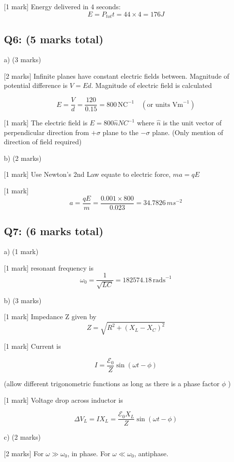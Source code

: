 \documentclass[a4paper,11pt]{article}
\begin{document}
[1 mark] Energy delivered in 4 seconds: 
\[ E = P_{tot} t = 44 \times 4 = 176 J \]

\subsection*{Q6: (5 marks total)}

a) (3 marks)

[2 marks] Infinite planes have constant electric fields between. Magnitude of potential difference is \( V = Ed \). Magnitude of electric field is calculated 

\[ E = \frac{V}{d} = \frac{120}{0.15} = 800 \, \text{NC}^{-1} \quad (\text{or units } \mathrm{Vm}^{-1}) \]

[1 mark] The electric field is \(E = 800 \hat{n} NC^{-1} \) where \( \hat{n} \) is the unit vector of perpendicular direction from \( +\sigma \) plane to the \( -\sigma \) plane. (Only mention of direction of field required)

b) (2 marks)

[1 mark] Use Newton’s 2nd Law equate to electric force, \( ma = qE \)

[1 mark] \[ a = \frac{qE}{m} = \frac{0.001 \times 800}{0.023} = 34.7826 \, ms^{-2} \]

\subsection*{Q7: (6 marks total)}

a) (1 mark) 

[1 mark]  resonant frequency is 
\[ \omega_0 = \frac{1}{\sqrt{LC}} = 182574.18 \, \mathrm{rads}^{-1} \]

b) (3 marks)

[1 mark] Impedance Z given by 
\[ Z = \sqrt{R^2 + (X_L - X_C)^2} \]

[1 mark] Current is

\[ I =  \frac{\mathcal{E}_0}{Z} \sin(\omega t - \phi) \]

(allow different trigonometric functions as long as there is a phase factor \( \phi \) ) 

[1 mark] Voltage drop across inductor is 

\[ \Delta{V_L} = I X_L = \frac{\mathcal{E}_0 X_L}{Z} \sin(\omega t - \phi) \]

c) (2 marks)

[2 marks] For \( \omega \gg \omega_{0} \), in phase. For \( \omega \ll \omega_{0} \), antiphase.  
\end{document}
